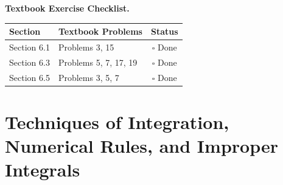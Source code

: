 \documentclass{natsirt}
\newenvironment{reviewbox}[1][]{\begin{whitebox}[#1]\textbf{Textbook Exercise Checklist. }}{\end{whitebox}}
\begin{document}
\begin{reviewbox}
    \begin{center}
    \begin{tabular}{|l|l|c|}
        \hline
        \textbf{Section} & \textbf{Textbook Problems} & \textbf{Status} \\
        \hline
        Section 6.1 & Problems 3, 15 & $\square$ Done \\
        Section 6.3 & Problems 5, 7, 17, 19 & $\square$ Done \\
        Section 6.5 & Problems 3, 5, 7 & $\square$ Done \\
        \hline
    \end{tabular}
    \end{center}
\end{reviewbox}


\section{Techniques of Integration, Numerical Rules, and Improper Integrals}
\end{document}

